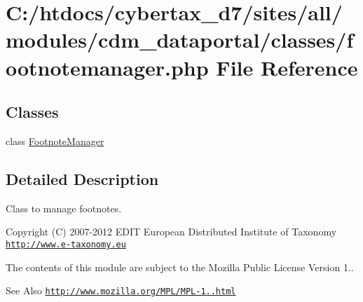 \hypertarget{footnotemanager_8php}{\section{C\-:/htdocs/cybertax\-\_\-d7/sites/all/modules/cdm\-\_\-dataportal/classes/footnotemanager.php File Reference}
\label{footnotemanager_8php}
}
\subsection*{Classes}
\begin{DoxyCompactItemize}
\item 
class \hyperlink{class_footnote_manager}{Footnote\-Manager}
\end{DoxyCompactItemize}


\subsection{Detailed Description}
Class to manage footnotes.

\begin{DoxyCopyright}{Copyright}
(C) 2007-\/2012 E\-D\-I\-T European Distributed Institute of Taxonomy \href{http://www.e-taxonomy.eu}{\tt http\-://www.\-e-\/taxonomy.\-eu}
\end{DoxyCopyright}
The contents of this module are subject to the Mozilla Public License Version 1.. \begin{DoxySeeAlso}{See Also}
\href{http://www.mozilla.org/MPL/MPL-1.1.html}{\tt http\-://www.\-mozilla.\-org/\-M\-P\-L/\-M\-P\-L-\/1..\-html} 
\end{DoxySeeAlso}
